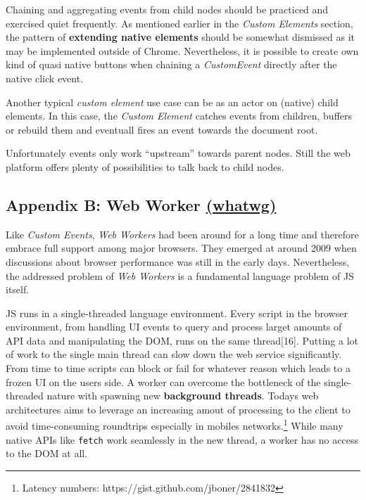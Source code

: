 \documentclass[]{assets/latex/ieee}
\begin{document}
Chaining and aggregating events from child nodes should be practiced and
exercised quiet frequently. As mentioned earlier in the \emph{Custom
Elements} section, the pattern of \textbf{extending native elements}
should be somewhat dismissed as it may be implemented outside of Chrome.
Nevertheless, it is possible to create own kind of quasi native buttons
when chaining a \emph{CustomEvent} directly after the native click
event.

Another typical \emph{custom element} use case can be as an actor on
(native) child elements. In this case, the \emph{Custom Element} catches
events from children, buffers or rebuild them and eventuall fires an
event towards the document root.

Unfortunately events only work ``upstream'' towards parent nodes. Still
the web platform offers plenty of possibilities to talk back to child
nodes.

\subsection{\texorpdfstring{Appendix B: Web Worker
\href{https://html.spec.whatwg.org/multipage/workers.html}{(whatwg)}}{Appendix B: Web Worker (whatwg)}}\label{appendix-b-web-worker-whatwg}

Like \emph{Custom Events}, \emph{Web Workers} had been around for a long
time and therefore embrace full support among major browsers. They
emerged at around 2009 when discussions about browser performance was
still in the early days. Nevertheless, the addressed problem of
\emph{Web Workers} is a fundamental language problem of JS itself.

JS runs in a single-threaded language environment. Every script in the
browser environment, from handling UI events to query and process larget
amounts of API data and manipulating the DOM, runs on the same
thread{[}16{]}. Putting a lot of work to the single main thread can slow
down the web service significantly. From time to time scripts can block
or fail for whatever reason which leads to a frozen UI on the users
side. A worker can overcome the bottleneck of the single-threaded nature
with spawning new \textbf{background threads}. Todays web architectures
aims to leverage an increasing amout of processing to the client to
avoid time-consuming roundtrips especially in mobiles
networks.\footnote{Latency numbers:
  https://gist.github.com/jboner/2841832} While many native APIs like
\texttt{fetch} work seamlessly in the new thread, a worker has no access
to the DOM at all.
\end{document}
